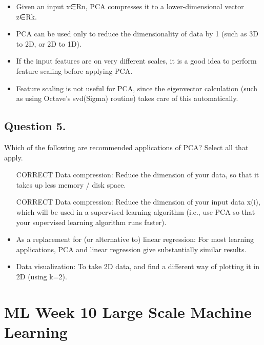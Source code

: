 \begin{itemize}
\item Given an input x∈Rn, PCA compresses it to a lower-dimensional vector z∈Rk.

\item PCA can be used only to reduce the dimensionality of data by 1 (such as 3D to 2D, or 2D to 1D).

\item If the input features are on very different scales, it is a good idea to perform feature scaling before applying PCA.

\item Feature scaling is not useful for PCA, since the eigenvector calculation (such as using Octave's svd(Sigma) routine) takes care of this automatically.
\end{itemize}
\subsection{ Question 5. }
Which of the following are recommended applications of PCA? Select all that apply.

\begin{itemize}
\item [CORRECT] Data compression: Reduce the dimension of your data, so that it takes up less memory / disk space.

\item [CORRECT] Data compression: Reduce the dimension of your input data x(i), which will be used in a supervised learning algorithm (i.e., use PCA so that your supervised learning algorithm runs faster).

\item As a replacement for (or alternative to) linear regression: For most learning applications, PCA and linear regression give substantially similar results.

\item Data visualization: To take 2D data, and find a different way of plotting it in 2D (using k=2).

\end{itemize}



\section*{ML Week 10 Large Scale Machine Learning}

